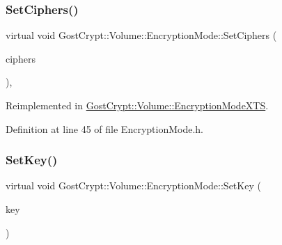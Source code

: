 \mbox{\label{class_gost_crypt_1_1_volume_1_1_encryption_mode_a96e5d889932eb1b2a3c657cd409198f6}} 
\subsubsection{\texorpdfstring{Set\+Ciphers()}{SetCiphers()}}
{\footnotesize\ttfamily virtual void Gost\+Crypt\+::\+Volume\+::\+Encryption\+Mode\+::\+Set\+Ciphers (\begin{DoxyParamCaption}\item[{const \hyperlink{namespace_gost_crypt_1_1_volume_ad32c730cdf3a63d2bafbac0f63f0740f}{Cipher\+Algorithm\+List} \&}]{ciphers }\end{DoxyParamCaption})\hspace{0.3cm}{\ttfamily [inline]}, {\ttfamily [virtual]}}



Reimplemented in \hyperlink{class_gost_crypt_1_1_volume_1_1_encryption_mode_x_t_s_a053dbb2201d89cc400416b63c57787de}{Gost\+Crypt\+::\+Volume\+::\+Encryption\+Mode\+X\+TS}.



Definition at line 45 of file Encryption\+Mode.\+h.

\mbox{\label{class_gost_crypt_1_1_volume_1_1_encryption_mode_a6e612b08918d56e532cca3c5f75ee7d6}} 
\subsubsection{\texorpdfstring{Set\+Key()}{SetKey()}}
{\footnotesize\ttfamily virtual void Gost\+Crypt\+::\+Volume\+::\+Encryption\+Mode\+::\+Set\+Key (\begin{DoxyParamCaption}\item[{const \hyperlink{class_gost_crypt_1_1_buffer_ptr}{Buffer\+Ptr} \&}]{key }\end{DoxyParamCaption})\hspace{0.3cm}{\ttfamily [pure virtual]}}



